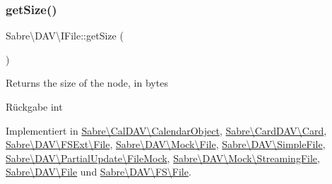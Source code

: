 \subsubsection{\texorpdfstring{get\+Size()}{getSize()}}
{\footnotesize\ttfamily Sabre\textbackslash{}\+D\+A\+V\textbackslash{}\+I\+File\+::get\+Size (\begin{DoxyParamCaption}{ }\end{DoxyParamCaption})}

Returns the size of the node, in bytes

\begin{DoxyReturn}{Rückgabe}
int 
\end{DoxyReturn}


Implementiert in \mbox{\hyperlink{class_sabre_1_1_cal_d_a_v_1_1_calendar_object_a18e48832b3f486a1c5c95da1c2d39661}{Sabre\textbackslash{}\+Cal\+D\+A\+V\textbackslash{}\+Calendar\+Object}}, \mbox{\hyperlink{class_sabre_1_1_card_d_a_v_1_1_card_aea671f67af75006c2845565d8a55599e}{Sabre\textbackslash{}\+Card\+D\+A\+V\textbackslash{}\+Card}}, \mbox{\hyperlink{class_sabre_1_1_d_a_v_1_1_f_s_ext_1_1_file_aec3768804d387a073610838d89bff5c9}{Sabre\textbackslash{}\+D\+A\+V\textbackslash{}\+F\+S\+Ext\textbackslash{}\+File}}, \mbox{\hyperlink{class_sabre_1_1_d_a_v_1_1_mock_1_1_file_aca58982336f6d9a272cd3617b56fce39}{Sabre\textbackslash{}\+D\+A\+V\textbackslash{}\+Mock\textbackslash{}\+File}}, \mbox{\hyperlink{class_sabre_1_1_d_a_v_1_1_simple_file_a1fa9715d7dda56738289e186923dd2b1}{Sabre\textbackslash{}\+D\+A\+V\textbackslash{}\+Simple\+File}}, \mbox{\hyperlink{class_sabre_1_1_d_a_v_1_1_partial_update_1_1_file_mock_aba348d3355af18e1b1bd8e54674e07f5}{Sabre\textbackslash{}\+D\+A\+V\textbackslash{}\+Partial\+Update\textbackslash{}\+File\+Mock}}, \mbox{\hyperlink{class_sabre_1_1_d_a_v_1_1_mock_1_1_streaming_file_a693c21cb705844f3d3defd4484976520}{Sabre\textbackslash{}\+D\+A\+V\textbackslash{}\+Mock\textbackslash{}\+Streaming\+File}}, \mbox{\hyperlink{class_sabre_1_1_d_a_v_1_1_file_ac50c6e65d39734d7858e95f080a46f4b}{Sabre\textbackslash{}\+D\+A\+V\textbackslash{}\+File}} und \mbox{\hyperlink{class_sabre_1_1_d_a_v_1_1_f_s_1_1_file_a5c081df437f59b33c8402123ceb45439}{Sabre\textbackslash{}\+D\+A\+V\textbackslash{}\+F\+S\textbackslash{}\+File}}.

\mbox{\label{interface_sabre_1_1_d_a_v_1_1_i_file_a0c30bc87b22d289f311c854f23993452}} 
